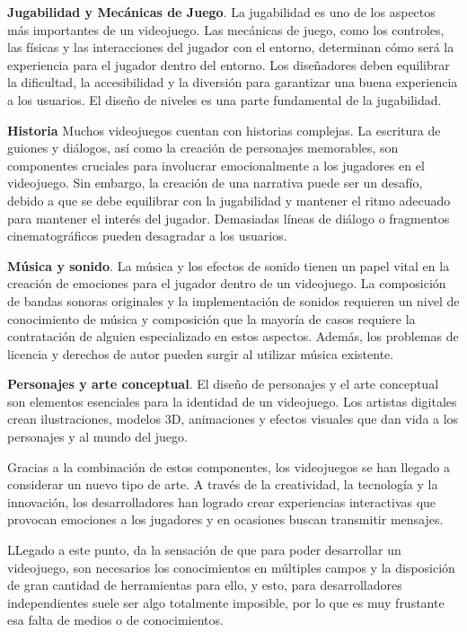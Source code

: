 \textbf{Jugabilidad y Mecánicas de Juego}. La jugabilidad es uno de los aspectos más importantes de un videojuego. Las mecánicas de juego, como los controles, las físicas y las interacciones del jugador con el entorno, determinan cómo será la experiencia para el jugador dentro del entorno. Los diseñadores deben equilibrar la dificultad, la accesibilidad y la diversión para garantizar una buena experiencia a los usuarios. El diseño de niveles es una parte fundamental de la jugabilidad.

\textbf{Historia} Muchos videojuegos cuentan con historias complejas. La escritura de guiones y diálogos, así como la creación de personajes memorables, son componentes cruciales para involucrar emocionalmente a los jugadores en el videojuego. Sin embargo, la creación de una narrativa puede ser un desafío, debido a que se debe equilibrar con la jugabilidad y mantener el ritmo adecuado para mantener el interés del jugador. Demasiadas líneas de diálogo o fragmentos cinematográficos pueden desagradar a los usuarios.

\textbf{Música y sonido}. La música y los efectos de sonido tienen un papel vital en la creación de emociones para el jugador dentro de un videojuego. La composición de bandas sonoras originales y la implementación de sonidos requieren un nivel de conocimiento de música y composición que la mayoría de casos requiere la contratación de alguien especializado en estos aspectos. Además, los problemas de licencia y derechos de autor pueden surgir al utilizar música existente.

\textbf{Personajes y arte conceptual}. El diseño de personajes y el arte conceptual son elementos esenciales para la identidad de un videojuego. Los artistas digitales crean ilustraciones, modelos 3D, animaciones y efectos visuales que dan vida a los personajes y al mundo del juego.

Gracias a la combinación de estos componentes, los videojuegos se han llegado a considerar un nuevo tipo de arte. A través de la creatividad, la tecnología y la innovación, los desarrolladores han logrado crear experiencias interactivas que provocan emociones a los jugadores y en ocasiones buscan transmitir mensajes.

LLegado a este punto, da la sensación de que para poder desarrollar un videojuego, son necesarios los conocimientos en múltiples campos y la disposición de gran cantidad de herramientas para ello, y esto, para desarrolladores independientes suele ser algo totalmente imposible, por lo que es muy frustante esa falta de medios o de conocimientos. 

